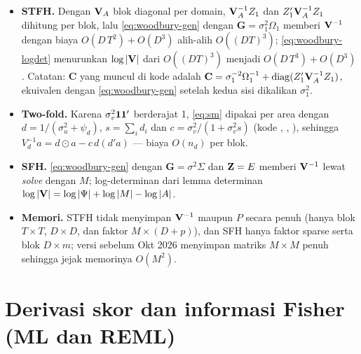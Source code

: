 \begin{itemize}
  \item \textbf{STFH.} Dengan $\mathbf{V}_A$ blok diagonal per domain,
        $\mathbf{V}_A^{-1}Z_1$ dan $Z_1'\mathbf{V}_A^{-1}Z_1$ dihitung per blok, lalu
        \eqref{eq:woodbury-gen} dengan $\mathbf G=\sigma_1^2\Omega_1$ memberi
        $\mathbf{V}^{-1}$ dengan biaya $O(D\,T^2)+O(D^3)$ alih-alih $O((DT)^3)$;
        \eqref{eq:woodbury-logdet} menurunkan $\log\left|\mathbf{V}\right|$ dari
        $O((DT)^3)$ menjadi $O(D\,T^3)+O(D^3)$. Catatan: $\mathbf C$ yang
        muncul di kode adalah
        $\mathbf C=\sigma_1^{-2}\Omega_1^{-1}+\operatorname{diag}(Z_1'\mathbf{V}_A^{-1}Z_1)$,
        ekuivalen dengan \eqref{eq:woodbury-gen} setelah kedua sisi
        dikalikan $\sigma_1^2$.
  \item \textbf{Two-fold.} Karena $\sigma_v^2\mathbf{1}\mathbf{1}'$ berderajat 1,
        \eqref{eq:sm} dipakai per area dengan
        $d=1/(\sigma_u^2+\psi_d)$, $s=\sum_i d_i$ dan
        $c=\sigma_v^2/(1+\sigma_v^2 s)$ (kode , ,
        ), sehingga $V_d^{-1}a=d\odot a-c\,d(d'a)$ --- biaya
        $O(n_d)$ per blok.
  \item \textbf{SFH.} \eqref{eq:woodbury-gen} dengan $\mathbf G=\sigma^2
        \Sigma$ dan $\mathbf{Z}=E$ memberi $\mathbf{V}^{-1}$ lewat \emph{solve} dengan
        $M$; log-determinan dari lemma determinan
        $\log\left|\mathbf{V}\right|=\log\left|\Psi\right|+\log\left|M\right|-\log\left|A\right|$.
  \item \textbf{Memori.} STFH tidak menyimpan $\mathbf{V}^{-1}$ maupun $P$ secara
        penuh (hanya blok $T\times T$, $D\times D$, dan faktor
        $M\times(D+p)$), dan SFH hanya faktor sparse serta blok
        $D\times m$; versi sebelum Okt 2026 menyimpan matriks $M\times M$
        penuh sehingga jejak memorinya $O(M^2)$.
\end{itemize}

\section{Derivasi skor dan informasi Fisher (ML dan REML)}\label{app:score}\label{sec:derivasi}

